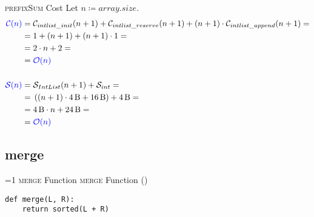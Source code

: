         \begin{frame}{\textsc{prefixSum} Cost}
            Let $n \coloneqq array.size$.
            \begin{align*}
                \textcolor{blue}{\mathcal{C}{\left(n\right)}} = & \; \mathcal{C}_{intlist\_init}{\left(n + 1\right)} + \mathcal{C}_{intlist\_reserve}{\left(n + 1\right)} + \left(n + 1\right) \cdot \mathcal{C}_{intlist\_append}{\left(n + 1\right)} = \\
                = & \; 1 + {\left(n + 1\right)} + \left(n + 1\right) \cdot 1 = \\
                = & \; 2 \cdot n + 2 =  \\
                = & \; \textcolor{blue}{\mathcal{O}{\left(n\right)}}
                \\ \\
                \textcolor{blue}{\mathcal{S}{\left(n\right)}} = & \; \mathcal{S}_{IntList}{\left(n + 1\right)} + \mathcal{S}_{int} = \\
                = & \; \left(\left(n + 1\right) \cdot \SI{4}{B} + \SI{16}{B}\right) + \SI{4}{B} = \\
                = & \; \SI{4}{B} \cdot n + \SI{24}{B} = \\
                = & \; \textcolor{blue}{\mathcal{O}{\left(n\right)}}
            \end{align*}
        \end{frame}

    \subsection{merge}
\setcounter{mergefunctioncounter}{1}
\newcommand{\mergefunctionframe}{%
    \ifnum\value{mergefunctioncounter}=1
        \textsc{merge} Function%
    \else
        \textsc{merge} Function (\themergefunctioncounter)%
    \fi
}
        \begin{frame}[containsverbatim]{\mergefunctionframe}
            \begin{verbatim}
def merge(L, R):
    return sorted(L + R)
                \end{verbatim}
        \end{frame}

